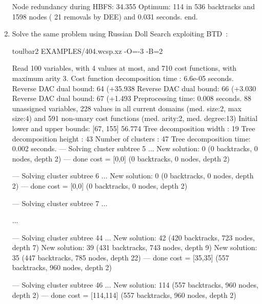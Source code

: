 \begin{enumerate}
{\begin{DoxyCode}
Node redundancy during HBFS: 34.355 %
Optimum: 114 in 536 backtracks and 1598 nodes ( 21 removals by DEE) and 0.031 seconds.
end.
\end{DoxyCode}}
\item Solve the same problem using Russian Doll Search exploiting BTD~\cite{Sanchez09a}:
\begin{DoxyCode}
	toulbar2 EXAMPLES/404.wcsp.xz -O=-3 -B=2
\end{DoxyCode}
{\scriptsize
\begin{DoxyCode}
Read 100 variables, with 4 values at most, and 710 cost functions, with maximum arity 3.
Cost function decomposition time : 6.6e-05 seconds.
Reverse DAC dual bound: 64 (+35.938%
Reverse DAC dual bound: 66 (+3.030%
Reverse DAC dual bound: 67 (+1.493%
Preprocessing time: 0.008 seconds.
88 unassigned variables, 228 values in all current domains (med. size:2, max size:4) and 591 non-unary cost functions (med. arity:2, med. degree:13)
Initial lower and upper bounds: [67, 155] 56.774%
Tree decomposition width  : 19
Tree decomposition height : 43
Number of clusters        : 47
Tree decomposition time: 0.002 seconds.
--- Solving cluster subtree 5 ...
New solution: 0 (0 backtracks, 0 nodes, depth 2)
---  done  cost = [0,0] (0 backtracks, 0 nodes, depth 2)

--- Solving cluster subtree 6 ...
New solution: 0 (0 backtracks, 0 nodes, depth 2)
---  done  cost = [0,0] (0 backtracks, 0 nodes, depth 2)

--- Solving cluster subtree 7 ...

...

--- Solving cluster subtree 44 ...
New solution: 42 (420 backtracks, 723 nodes, depth 7)
New solution: 39 (431 backtracks, 743 nodes, depth 9)
New solution: 35 (447 backtracks, 785 nodes, depth 22)
---  done  cost = [35,35] (557 backtracks, 960 nodes, depth 2)

--- Solving cluster subtree 46 ...
New solution: 114 (557 backtracks, 960 nodes, depth 2)
---  done  cost = [114,114] (557 backtracks, 960 nodes, depth 2)


\end{DoxyCode}}
\end{enumerate}
